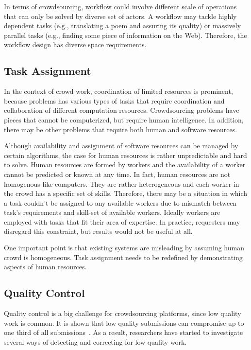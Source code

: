 In terms of crowdsourcing, workflow could involve different scale of operations that 
can only be solved by diverse set of actors. A workflow may tackle highly dependent 
tasks (e.g., translating a poem and assuring its quality) or massively parallel 
tasks (e.g., finding some piece of information on the Web). Therefore, the workflow 
design has diverse space requirements.

\subsection{Task Assignment}
In the context of crowd work, coordination of limited resources is prominent, 
because problems has various types of tasks that require coordination and 
collaboration of different computation resources. Crowdsourcing problems  
have pieces that cannot be computerized, but require human intelligence. In 
addition, there may be other problems that require both human and software 
resources.

Although availability and assignment of software resources can be managed 
by certain algorithms, the case for human resources is rather unpredictable and 
hard to solve. Human resources are formed by workers and the availability of a 
worker cannot be predicted or known at any time. In fact, human resources 
are not homogenous like computers. They are rather heterogeneous and each 
worker in the crowd has a specific set of skills. Therefore, there may be a situation 
in which a task couldn't be assigned to any available workers due to mismatch 
between task's requirements and skill-set of available workers. Ideally workers 
are employed with tasks that fit their area of expertise. In practice, requesters 
may disregard this constraint, but results would not be useful at all.

One important point is that existing systems are misleading by assuming 
human crowd is homogeneous. Task assignment needs to be redefined 
by demonstrating aspects of human resources.

\subsection{Quality Control}
Quality control is a big challenge for crowdsourcing platforms, since low quality work 
is common. It is shown that low quality submissions can compromise up to one third 
of all submissions~\cite{Bernstein2010}. As a result, researchers have started to 
investigate several ways of detecting and correcting for low quality work.

